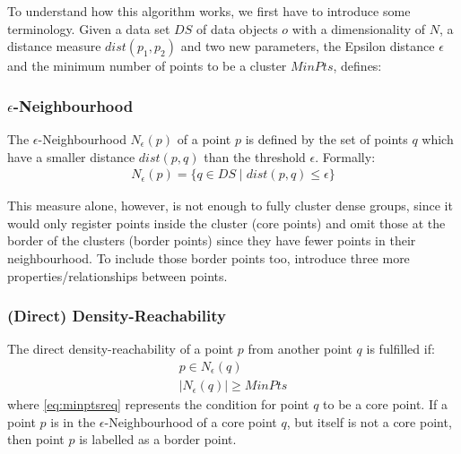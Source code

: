 To understand how this algorithm works, we first have to introduce some terminology.
Given a data set $DS$ of data objects $o$ with a dimensionality of $N$, a distance measure $dist(p_1,p_2)$ and two new parameters, the Epsilon distance $\epsilon$ and the minimum number of points to be a cluster $MinPts$, \citeauthor{DBSCANEKSX96} defines:

\subsubsection*{$\epsilon$-Neighbourhood}
The $\epsilon$-Neighbourhood $N_{\epsilon}(p)$ of a point $p$ is defined by the set of points $q$ which have a smaller distance $dist(p,q)$ than the threshold $\epsilon$. Formally: 
\begin{align}
    N_{\epsilon}(p)=\{q \in DS \mid dist(p,q) \leq \epsilon\}
\end{align}

This measure alone, however, is not enough to fully cluster dense groups, since it would only register points inside the cluster (core points) and omit those at the border of the clusters (border points) since they have fewer points in their neighbourhood. To include those border points too, \citeauthor{DBSCANEKSX96} introduce three more properties/relationships between points.

\subsubsection*{(Direct) Density-Reachability}
The direct density-reachability of a point $p$ from another point $q$ is fulfilled if:
\begin{align}
    p \in N_{\epsilon}(q)\label{eq:pinN}\\
    |N_{\epsilon}(q)|\geq MinPts\label{eq:minptsreq}
\end{align}
where \autoref{eq:minptsreq} represents the condition for point \(q\) to be a core point. If a point \(p\) is in the $\epsilon$-Neighbourhood of a core point $q$, but itself is not a core point, then point $p$ is labelled as a border point. 

